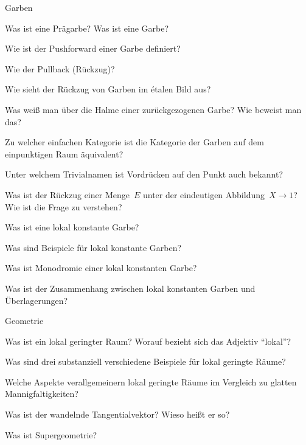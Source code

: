 \documentclass{uebblatt}
\begin{document}
\begin{aufgabeE}{Garben}
\item Was ist eine Prägarbe? Was ist eine Garbe?
\item Wie ist der Pushforward einer Garbe definiert?
\item Wie der Pullback (Rückzug)?
\item Wie sieht der Rückzug von Garben im étalen Bild aus?
\item Was weiß man über die Halme einer zurückgezogenen Garbe? Wie beweist man
das?
\item Zu welcher einfachen Kategorie ist die Kategorie der Garben auf dem
einpunktigen Raum äquivalent?
\item Unter welchem Trivialnamen ist Vordrücken auf den Punkt auch bekannt?
\item Was ist der Rückzug einer Menge~$E$ unter der eindeutigen Abbildung~$X
\to 1$? Wie ist die Frage zu verstehen?
\item Was ist eine lokal konstante Garbe?
\item Was sind Beispiele für lokal konstante Garben?
\item Was ist Monodromie einer lokal konstanten Garbe?
\item Was ist der Zusammenhang zwischen lokal konstanten Garben und
Überlagerungen?
\end{aufgabeE}

\begin{aufgabeE}{Geometrie}
\item Was ist ein lokal geringter Raum? Worauf bezieht sich das Adjektiv
"`lokal"'?
\item Was sind drei substanziell verschiedene Beispiele für lokal geringte Räume?
\item Welche Aspekte verallgemeinern lokal geringte Räume im Vergleich zu
glatten Mannigfaltigkeiten?
\item Was ist der wandelnde Tangentialvektor? Wieso heißt er so?
\item Was ist Supergeometrie?
\end{aufgabeE}
\end{document}
